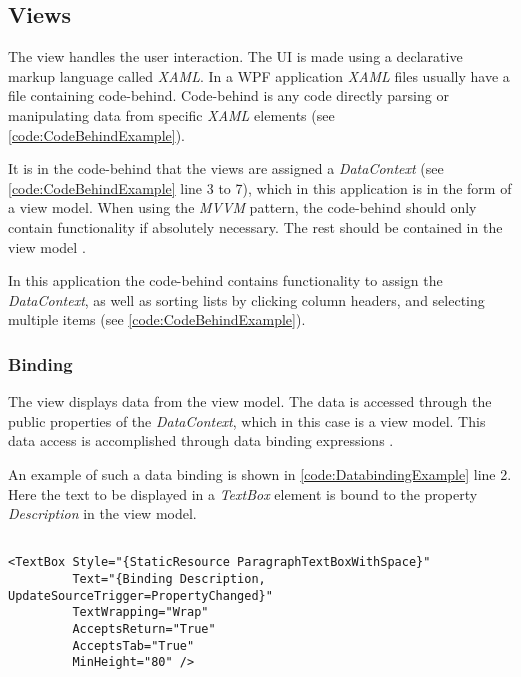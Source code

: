 \subsection{Views} \label{ssc:Views}
The view handles the user interaction. The UI is made using a declarative markup language called \textit{XAML}. In a WPF application \textit{XAML} files usually have a file containing code-behind. Code-behind is any code directly parsing or manipulating data from specific \textit{XAML} elements (see \autoref{code:CodeBehindExample}). \citep{XamlOverview}
\par
It is in the code-behind that the views are assigned a \textit{DataContext} (see \autoref{code:CodeBehindExample} line 3 to 7), which in this application is in the form of a view model. When using the \textit{MVVM} pattern, the code-behind should only contain functionality if absolutely necessary. The rest should be contained in the view model \citep{WPFandMVVM}.
\par
In this application the code-behind contains functionality to assign the \textit{DataContext}, as well as sorting lists by clicking column headers, and selecting multiple items (see \autoref{code:CodeBehindExample}).

\subsubsection*{Binding}
The view displays data from the view model. The data is accessed through the public properties of the \textit{DataContext}, which in this case is a view model. This data access is accomplished through data binding expressions \citep{Bindings}.
\par
An example of such a data binding is shown in \autoref{code:DatabindingExample} line 2. Here the text to be displayed in a \textit{TextBox} element is bound to the property \textit{Description} in the view model.

\begin{listing}[H]
\begin{verbatim}

<TextBox Style="{StaticResource ParagraphTextBoxWithSpace}"
         Text="{Binding Description, UpdateSourceTrigger=PropertyChanged}"
         TextWrapping="Wrap"
         AcceptsReturn="True"
         AcceptsTab="True"
         MinHeight="80" />

\end{verbatim}
\label{code:DatabindingExample}
\end{listing}
\par

